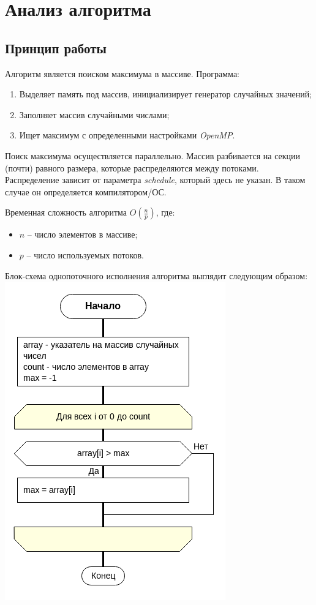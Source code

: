 \section{Анализ алгоритма}

\subsection{Принцип работы}

Алгоритм является поиском максимума в массиве.
Программа:
\begin{enumerate}
    \item Выделяет память под массив, инициализирует генератор случайных значений;
    \item Заполняет массив случайными числами;
    \item Ищет максимум с определенными настройками \textit{OpenMP}.
\end{enumerate}

Поиск максимума осуществляется параллельно. 
Массив разбивается на секции (почти) равного размера, которые распределяются между потоками.
Распределение зависит от параметра \textit{schedule}, который здесь не указан.
В таком случае он определяется компилятором/ОС.

Временная сложность алгоритма $O(\frac{n}{p})$, где:
\begin{itemize}
 \item $n$ -- число элементов в массиве;
 \item $p$ -- число используемых потоков.
\end{itemize}

Блок-схема однопоточного исполнения алгоритма выглядит следующим образом:\\
\includegraphics[scale=0.6]{res/flowchart.png}

